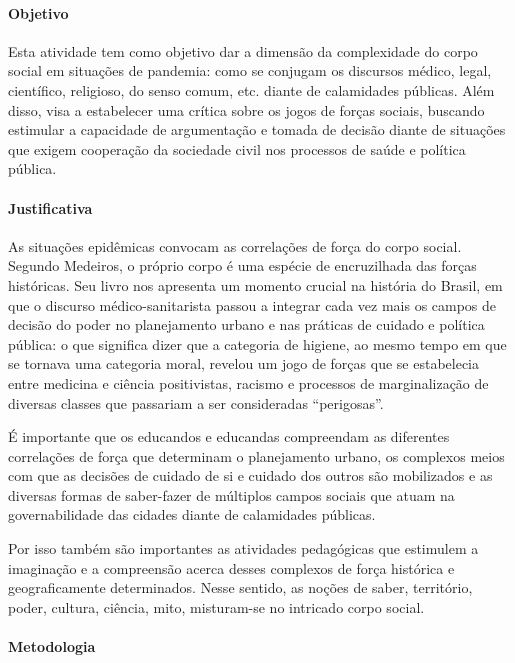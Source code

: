 \documentclass[12pt]{extarticle}
\begin{document}
\paragraph{Objetivo}

Esta atividade tem como objetivo dar a dimensão da complexidade do corpo
social em situações de pandemia: como se conjugam os discursos médico,
legal, científico, religioso, do senso comum, etc. diante de calamidades
públicas. Além disso, visa a estabelecer uma crítica sobre os jogos de
forças sociais, buscando estimular a capacidade de argumentação e tomada
de decisão diante de situações que exigem cooperação da sociedade civil
nos processos de saúde e política pública.

\paragraph{Justificativa}

As situações epidêmicas convocam as correlações de força do corpo
social. Segundo Medeiros, o próprio corpo é uma espécie de encruzilhada
das forças históricas. Seu livro nos apresenta um momento crucial na
história do Brasil, em que o discurso médico-sanitarista passou a
integrar cada vez mais os campos de decisão do poder no planejamento
urbano e nas práticas de cuidado e política pública: o que significa
dizer que a categoria de higiene, ao mesmo tempo em que se tornava uma
categoria moral, revelou um jogo de forças que se estabelecia entre
medicina e ciência positivistas, racismo e processos de marginalização
de diversas classes que passariam a ser consideradas ``perigosas''.

É importante que os educandos e educandas compreendam as diferentes
correlações de força que determinam o planejamento urbano, os complexos
meios com que as decisões de cuidado de si e cuidado dos outros são
mobilizados e as diversas formas de saber-fazer de múltiplos campos
sociais que atuam na governabilidade das cidades diante de calamidades
públicas.

Por isso também são importantes as atividades pedagógicas que estimulem
a imaginação e a compreensão acerca desses complexos de força histórica
e geograficamente determinados. Nesse sentido, as noções de saber,
território, poder, cultura, ciência, mito, misturam-se no intricado
corpo social.

\paragraph{Metodologia}
\end{document}
